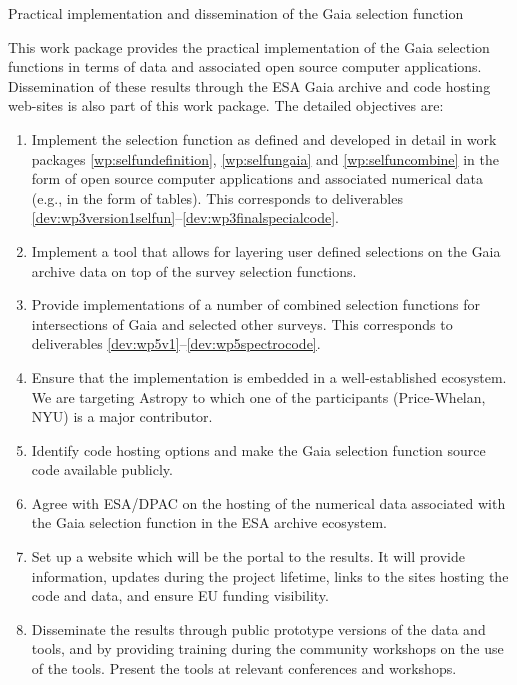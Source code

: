 \begin{workpackage}{Practical implementation and dissemination of the Gaia selection function}
  \label{wp:selfunimplementation}
  \wpend{\duration} %
 
  \makewptable %

  \begin{wpobjectives}
    This work package provides the practical implementation of the Gaia selection functions in terms of data and associated open source computer applications. Dissemination of these results through the ESA Gaia archive and code hosting web-sites is also part of this work package. The detailed objectives are:
    \begin{enumerate}
      \item Implement the selection function as defined and developed in detail in work packages \ref{wp:selfundefinition}, \ref{wp:selfungaia} and \ref{wp:selfuncombine} in the form of open source computer applications and associated numerical data (e.g., in the form of tables). This corresponds to deliverables \ref{dev:wp3version1selfun}--\ref{dev:wp3finalspecialcode}.
      \item Implement a tool that allows for layering user defined selections on the Gaia archive data on top of the survey selection functions.
      \item Provide implementations of a number of combined selection functions for intersections of Gaia and selected other surveys. This corresponds to deliverables \ref{dev:wp5v1}--\ref{dev:wp5spectrocode}.
      \item Ensure that the implementation is embedded in a well-established ecosystem. We are targeting Astropy to which one of the participants (Price-Whelan, NYU) is a major contributor.
      \item Identify code hosting options and make the Gaia selection function source code available publicly.
      \item Agree with ESA/DPAC on the hosting of the numerical data associated with the Gaia selection function in the ESA archive ecosystem.
      \item Set up a website which will be the portal to the {\acro} results. It will provide information, updates during the project lifetime, links to the sites hosting the code and data, and ensure EU funding visibility.
      \item Disseminate the results through public prototype versions of the {\acro} data and tools, and by providing training during the community workshops on the use of the tools. Present the {\acro} tools at relevant conferences and workshops.
    \end{enumerate}
  \end{wpobjectives}


\end{workpackage}
